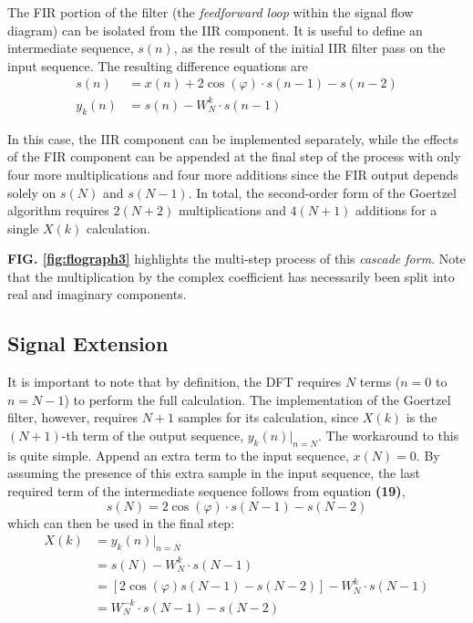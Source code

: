 \documentclass[reprint,amsmath,amssymb,aps,pra]{revtex4-2}
\begin{document}
The FIR portion of the filter (the \textit{feedforward loop} within the signal flow diagram) can be isolated from the IIR component. It is useful to define an intermediate sequence, $s(n)$, as the result of the initial IIR filter pass on the input sequence. The resulting difference equations are
\begin{align}
    s(n) & = x(n) + 2\cos(\varphi)\cdot s(n-1) - s(n-2) \\
    y_k(n) & = s(n) - W_N^k\cdot s(n-1)
\end{align}

In this case, the IIR component can be implemented separately, while the effects of the FIR component can be appended at the final step of the process with only four more multiplications and four more additions since the FIR output depends solely on $s(N)$ and $s(N-1)$. In total, the second-order form of the Goertzel algorithm requires $2(N + 2)$ multiplications and $4(N+1)$ additions for a single $X(k)$ calculation.

\textbf{FIG. \ref{fig:flograph3}} highlights the multi-step process of this \textit{cascade form}. Note that the multiplication by the complex coefficient has necessarily been split into real and imaginary components.

\subsection{Signal Extension}

It is important to note that by definition, the DFT requires $N$ terms ($n=0$ to $n=N-1$) to perform the full calculation. The implementation of the Goertzel filter, however, requires $N+1$ samples for its calculation, since $X(k)$ is the $(N+1)$-th term of the output sequence, $y_k(n)|_{n=N}$. The workaround to this is quite simple. Append an extra term to the input sequence, $x(N) = 0$. By assuming the presence of this extra sample in the input sequence, the last required term of the intermediate sequence follows from equation \textbf{(19)}, 
\begin{equation}
    s(N) = 2\cos(\varphi)\cdot s(N-1) - s(N-2)
\end{equation}
which can then be used in the final step: 
\begin{align}
    X(k) & = y_k(n)|_{n=N} \\
    & = s(N) - W_N^k\cdot s(N-1) \nonumber \\
    & = [2\cos(\varphi) s(N-1) - s(N-2)] - W_N^k\cdot s(N-1)  \nonumber \\
    & = W_N^{-k}\cdot s(N-1) - s(N-2) \nonumber
\end{align}
\end{document}
